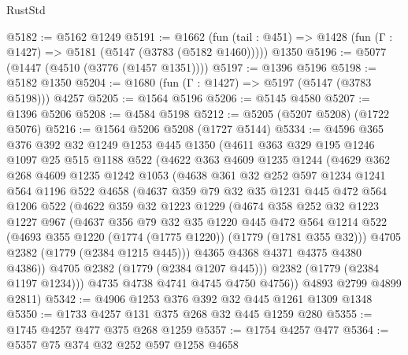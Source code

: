 \begin{lexlean}{RustStd}
\begin{coremodule}
@5182 := @5162 @1249
@5191 := @1662
    (fun (tail : @451) => @1428 (fun (Γ : @1427) => @5181 (@5147 (@3783 (@5182 @1460)))))
    @1350
@5196 := @5077 (@1447 (@4510 (@3776 (@1457 @1351))))
@5197 := @1396 @5196
@5198 := @5182 @1350
@5204 := @1680 (fun (Γ : @1427) => @5197 (@5147 (@3783 @5198))) @4257
@5205 := @1564 @5196
@5206 := @5145 @4580
@5207 := @1396 @5206
@5208 := @4584 @5198
@5212 := @5205 (@5207 @5208) (@1722 @5076)
@5216 := @1564 @5206 @5208 (@1727 @5144)
@5334 := @4596
    @365
    @376
    @392
    @32
    @1249
    @1253
    @445
    @1350
    (@4611
      @363
      @329
      @195
      @1246
      @1097
      @25
      @515
      @1188
      @522
      (@4622
        @363
        @4609
        @1235
        @1244
        (@4629
          @362
          @268
          @4609
          @1235
          @1242
          @1053
          (@4638
            @361
            @32
            @252
            @597
            @1234
            @1241
            @564
            @1196
            @522
            @4658
            (@4637
              @359
              @79
              @32
              @35
              @1231
              @445
              @472
              @564
              @1206
              @522
              (@4622
                @359
                @32
                @1223
                @1229
                (@4674
                  @358
                  @252
                  @32
                  @1223
                  @1227
                  @967
                  (@4637
                    @356
                    @79
                    @32
                    @35
                    @1220
                    @445
                    @472
                    @564
                    @1214
                    @522
                    (@4693 @355 @1220 (@1774 (@1775 @1220)) (@1779 (@1781 @355 @32)))
                    @4705
                    @2382
                    (@1779 (@2384 @1215 @445)))
                  @4365
                  @4368
                  @4371
                  @4375
                  @4380
                  @4386))
              @4705
              @2382
              (@1779 (@2384 @1207 @445)))
            @2382
            (@1779 (@2384 @1197 @1234)))
          @4735
          @4738
          @4741
          @4745
          @4750
          @4756))
      @4893
      @2799
      @4899
      @2811)
@5342 := @4906 @1253 @376 @392 @32 @445 @1261 @1309 @1348
@5350 := @1733 @4257 @131 @375 @268 @32 @445 @1259 @280
@5355 := @1745 @4257 @477 @375 @268 @1259
@5357 := @1754 @4257 @477
@5364 := @5357 @75 @374 @32 @252 @597 @1258 @4658

\end{coremodule}
\end{lexlean}
